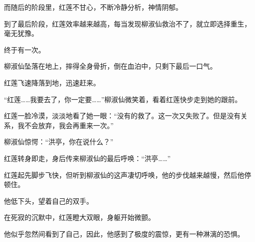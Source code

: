 \begin{this_body}
而随后的阶段里，红莲不甘心，不断冷静分析，神情阴郁。

到了最后阶段，红莲效率越来越高，每当发现柳淑仙救治不了，就立即选择重生，毫无犹豫。

终于有一次。

柳淑仙坠落在地上，摔得全身骨折，倒在血泊中，只剩下最后一口气。

红莲飞速降落到地，迅速赶来。

“红莲……我要去了，你一定要……”柳淑仙微笑着，看着红莲快步走到她的跟前。

红莲一脸冷漠，淡淡地看了她一眼：“没有的救了。这一次又失败了。但是没有关系，我不会放弃，我会再重来一次。”

柳淑仙惊愕：“洪亭，你在说什么？”

红莲转身即走，身后传来柳淑仙的最后呼唤：“洪亭……”

红莲起先脚步飞快，但听到柳淑仙的这声凄切呼唤，他的步伐越来越慢，然后他停顿住。

他低下头，望着自己的双手。

在死寂的沉默中，红莲瞪大双眼，身躯开始微颤。

他似乎忽然间看到了自己，因此，他感到了极度的震惊，更有一种淋漓的恐惧。

\end{this_body}


